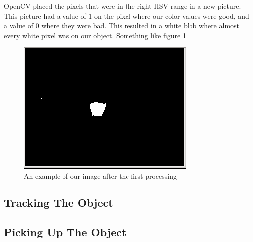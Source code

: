 OpenCV placed the pixels that were in the right HSV range in a new picture. This picture had a value of 1 on the pixel where our color-values were good, and a value of 0 where they were bad. This resulted in a white blob where almost every white pixel was on our object. Something like figure \ref{processed}

\begin{figure}
  \centering
      \includegraphics[scale=0.35]{processedImage.png}
  \caption{An example of our image after the first processing}
  \label{processed}
\end{figure}





\subsection{Tracking The Object}

\subsection{Picking Up The Object}

